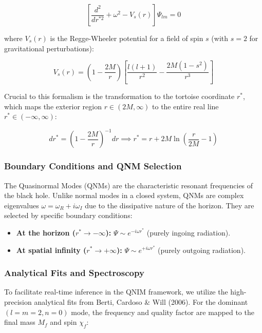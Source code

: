 \documentclass[11pt,a4paper,spanish]{book}
\numberwithin{equation}{chapter}
\numberwithin{figure}{chapter}
\numberwithin{equation}{chapter}
\numberwithin{figure}{chapter}
\numberwithin{table}{chapter}
\begin{document}
\begin{equation}
\left[ \frac{d^2}{dr^{*2}} + \omega^2 - V_s(r) \right] \Psi_{lm} = 0
\end{equation}

where $V_s(r)$ is the Regge-Wheeler potential for a field of spin $s$ (with $s=2$ for gravitational perturbations):

\begin{equation}
V_s(r) = \left( 1 - \frac{2M}{r} \right) \left[ \frac{l(l+1)}{r^2} - \frac{2M(1-s^2)}{r^3} \right]
\end{equation}

Crucial to this formalism is the transformation to the tortoise coordinate $r^*$, which maps the exterior region $r \in (2M, \infty)$ to the entire real line $r^* \in (-\infty, \infty)$:

\begin{equation}
dr^* = \left( 1 - \frac{2M}{r} \right)^{-1} dr \implies r^* = r + 2M \ln\left( \frac{r}{2M} - 1 \right)
\end{equation}



\subsubsection{Boundary Conditions and QNM Selection}

The Quasinormal Modes (QNMs) are the characteristic resonant frequencies of the black hole. Unlike normal modes in a closed system, QNMs are complex eigenvalues $\omega = \omega_R + i\omega_I$ due to the dissipative nature of the horizon. They are selected by specific boundary conditions:
\begin{itemize}
    \item \textbf{At the horizon ($r^* \to -\infty$):} $\Psi \sim e^{-i\omega r^*}$ (purely ingoing radiation).
    \item \textbf{At spatial infinity ($r^* \to +\infty$):} $\Psi \sim e^{+i\omega r^*}$ (purely outgoing radiation).
\end{itemize}

\subsubsection{Analytical Fits and Spectroscopy}

To facilitate real-time inference in the QNIM framework, we utilize the high-precision analytical fits from Berti, Cardoso \& Will (2006). For the dominant $(l=m=2, n=0)$ mode, the frequency and quality factor are mapped to the final mass $M_f$ and spin $\chi_f$:
\end{document}
